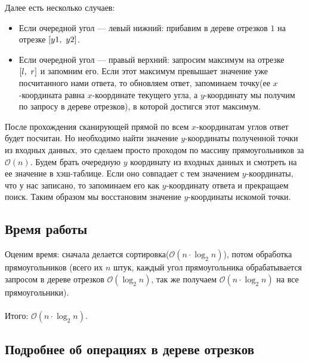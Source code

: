 \documentclass{article}
\begin{document}
Далее есть несколько случаев:
\begin{itemize} 
	\item Если очередной угол --- левый нижний: 
	прибавим в дереве отрезков $1$ на отрезке $[y1,\text{\space} y2]$. 
	\item Если очередной угол --- правый верхний:
	запросим максимум на отрезке $[l, \text{\space} r]$ и запомним его. Если этот максимум превышает значение уже посчитанного нами ответа, то обновляем ответ, запоминаем точку(ее $x$-координата равна $x$-координате текущего угла, а $y$-координату мы получим по запросу в дереве отрезков), в которой достигся этот максимум.\end{itemize}
После прохождения сканирующей прямой по всем $x$-координатам углов ответ будет посчитан. Но необходимо найти значение $y$-координаты полученной точки из входных данных, это сделаем просто проходом по массиву прямоугольников за $\mathcal{O}(n)$. Будем брать очередную $y$ координату из входных данных и смотреть на ее значение в хэш-таблице. Если оно совпадает с тем значением $y$-координаты, что у нас записано, то запоминаем его как $y$-координату ответа и прекращаем поиск. Таким образом мы восстановим значение $y$-координаты искомой точки.
\subsection*{Время работы}
Оценим время: сначала делается сортировка($\mathcal{O}(n\cdot \log_2{n})$), потом обработка прямоугольников (всего их $n$ штук, каждый угол прямоугольника обрабатывается запросом в дереве отрезков $\mathcal{O}(\log_2{n})$, так же получаем $\mathcal{O}(n\cdot \log_2{n})$ на все прямоугольники).
\\\\
Итого: $\mathcal{O}(n\cdot \log_2{n})$. 

\subsection*{Подробнее об операциях в дереве отрезков}\
\end{document}
